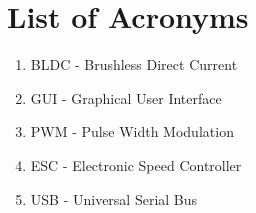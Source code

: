 \section{List of Acronyms}
  
\begin{enumerate} 
  \item BLDC - Brushless Direct Current 
  \item GUI - Graphical User Interface
  \item PWM - Pulse Width Modulation
  \item ESC - Electronic Speed Controller
  \item USB - Universal Serial Bus
\end{enumerate}
